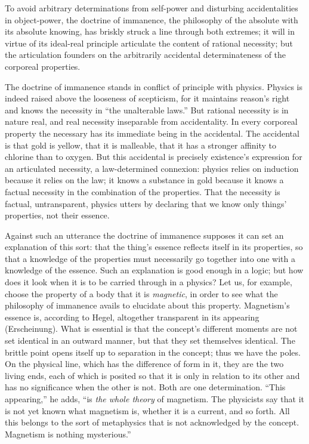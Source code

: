 \documentclass[12pt,a4paper]{book}
\begin{document}
To avoid arbitrary determinations from self-power and disturbing accidentalities in object-power, the doctrine of
immanence, the philosophy of the absolute with its absolute knowing, has briskly struck a line through both extremes; it
will in virtue of its ideal-real principle articulate the content of rational necessity; but the articulation founders on
the arbitrarily accidental determinateness of the corporeal properties.

The doctrine of immanence stands in conflict of principle with physics. Physics is indeed raised above the looseness of
scepticism, for it maintains reason's right and knows the necessity in ``the unalterable laws.'' But rational necessity is
in nature real, and real necessity inseparable from
accidentality. In every corporeal property the necessary has its immediate being in the accidental. The accidental
is that gold is yellow, that it is malleable, that it has a stronger affinity to chlorine than to oxygen. But this
accidental is precisely existence's expression for an articulated necessity, a law-determined connexion: physics
relies on induction because it relies on the law; it knows a substance in gold because it knows a factual necessity
in the combination of the properties. That the necessity is factual, untransparent, physics utters by declaring
that we know only things' properties, not their essence.

Against such an utterance the doctrine of immanence supposes it can set an explanation of this sort: that the thing's
essence reflects itself in its properties, so that a knowledge of the properties must necessarily go together into
one with a knowledge of the essence. Such an explanation is good enough in a logic; but how does it look when it is
to be carried through in a physics? Let us, for example, choose the property of a body that it is \emph{magnetic}, in
order to see what the philosophy of immanence avails to elucidate about this property. Magnetism's essence is,
according to Hegel, altogether transparent in its appearing (Erscheinung). What is essential is that the concept's
different moments are not set identical in an outward manner, but that they set themselves identical. The brittle
point opens itself up to separation in the concept; thus we have the poles. On the physical line, which has the
difference of form in it, they are the two living ends, each of which is posited so that it is only in relation to
its other and has no significance when the other is not. Both are one determination. ``This appearing,'' he adds,
``is \emph{the whole theory} of magnetism. The physicists say that it is not yet known what magnetism is, whether it
is a current, and so forth. All this belongs to the sort of metaphysics that is not
acknowledged by the concept. Magnetism is nothing mysterious.''
\end{document}
